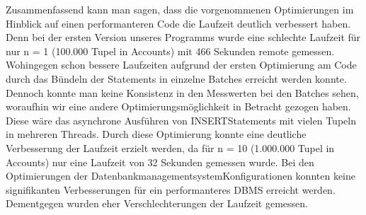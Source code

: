 Zusammenfassend kann man sagen, dass die vorgenommenen Optimierungen im Hinblick auf einen performanteren Code die Laufzeit deutlich verbessert haben.
Denn bei der ersten Version unseres Programms wurde eine schlechte Laufzeit für nur n = 1 (100.000 Tupel in Accounts) mit 466 Sekunden remote gemessen.
Wohingegen schon bessere Laufzeiten aufgrund der ersten Optimierung am Code durch das Bündeln der Statements in einzelne Batches erreicht werden konnte.
Dennoch konnte man keine Konsistenz in den Messwerten bei den Batches sehen, woraufhin wir eine andere Optimierungsmöglichkeit in Betracht gezogen haben.
Diese wäre das asynchrone Ausführen von INSERT\-Statements mit vielen Tupeln in mehreren Threads.
Durch diese Optimierung konnte eine deutliche Verbesserung der Laufzeit erzielt werden, da für n = 10 (1.000.000 Tupel in Accounts) nur eine Laufzeit von 32 Sekunden gemessen wurde.
Bei den Optimierungen der Datenbankmanagementsystem\-Konfigurationen konnten keine signifikanten Verbesserungen für ein performanteres DBMS erreicht werden.
Dementgegen wurden eher Verschlechterungen der Laufzeit gemessen.